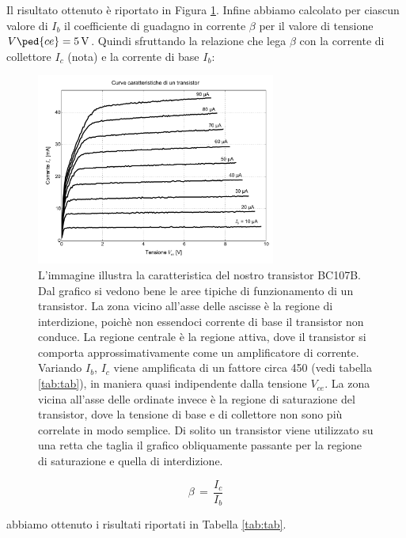 Il risultato ottenuto è riportato in Figura \ref{fig:cara}.
Infine abbiamo calcolato per ciascun valore di $I_b$ il coefficiente di guadagno in corrente $\beta$ per il valore di tensione $V\ped{ce}=\SI{5}{\volt}$. Quindi sfruttando la relazione che lega $\beta$ con la corrente di collettore $I_c$ (nota) e la corrente di base $I_b$:

\begin{figure}
	\centering
	\includegraphics[width=0.7\textwidth]{transistor.pdf}
	\caption{L'immagine illustra la caratteristica del nostro transistor BC107B. Dal grafico si vedono bene le aree
	    tipiche di funzionamento di un transistor. La zona vicino all'asse delle ascisse è la regione di interdizione,
	    poichè non essendoci corrente di base il transistor non conduce. La regione centrale è la regione attiva,
	    dove il transistor si comporta approssimativamente come un amplificatore di corrente. Variando $I_b$,
	    $I_c$ viene amplificata di un fattore circa 450 (vedi tabella \ref{tab:tab}), in maniera quasi indipendente
	    dalla tensione $V_{ce}$.
	    La zona vicina all'asse delle ordinate invece è la regione di saturazione del transistor,
	    dove la tensione di base e di collettore non sono più correlate in modo semplice.
	    Di solito un transistor
	    viene utilizzato su una retta che taglia il grafico obliquamente passante per la regione
	    di saturazione e quella di interdizione.}
	\label{fig:cara}
\end{figure}

\begin{equation}
	\beta \,=\, \frac{I_c}{I_b}
\end{equation}

abbiamo ottenuto i risultati riportati in Tabella \ref{tab:tab}.

